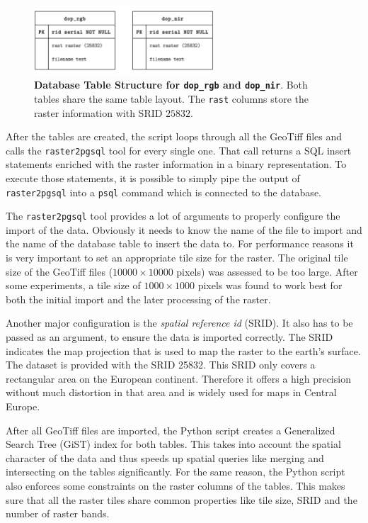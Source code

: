 \begin{figure}[h]
    \centering
    \includegraphics[width=0.6\textwidth]{images/dop_entities}
    \caption[Database Table Structure for \texttt{dop\_rgb} and \texttt{dop\_nir}]
    {\textbf{Database Table Structure for \texttt{dop\_rgb} and \texttt{dop\_nir}}. Both tables share the same table layout. The \texttt{rast} columns store the raster information with SRID $25832$.}
    \label{fig:dop_entities}
\end{figure}

After the tables are created, the script loops through all the GeoTiff files and calls the \texttt{raster2pgsql} tool for every single one. That call returns a SQL insert statements enriched with the raster information in a binary representation. To execute those statements, it is possible to simply pipe the output of \texttt{raster2pgsql} into a \texttt{psql} command which is connected to the database.

The \texttt{raster2pgsql} tool provides a lot of arguments to properly configure the import of the data. Obviously it needs to know the name of the file to import and the name of the database table to insert the data to. For performance reasons it is very important to set an appropriate tile size for the raster. The original tile size of the GeoTiff files ($10000\times 10000$ pixels) was assessed to be too large. After some experiments, a tile size of $1000\times 1000$ pixels was found to work best for both the initial import and the later processing of the raster.

Another major configuration is the \emph{spatial reference id} (SRID). It also has to be passed as an argument, to ensure the data is imported correctly. The SRID indicates the map projection that is used to map the raster to the earth's surface. The dataset is provided with the SRID 25832. This SRID only covers a rectangular area on the European continent. Therefore it offers a high precision without much distortion in that area and is widely used for maps in Central Europe.

After all GeoTiff files are imported, the Python script creates a Generalized Search Tree (GiST) index for both tables. This takes into account the spatial character of the data and thus speeds up spatial queries like merging and intersecting on the tables significantly. For the same reason, the Python script also enforces some constraints on the raster columns of the tables. This makes sure that all the raster tiles share common properties like tile size, SRID and the number of raster bands.

